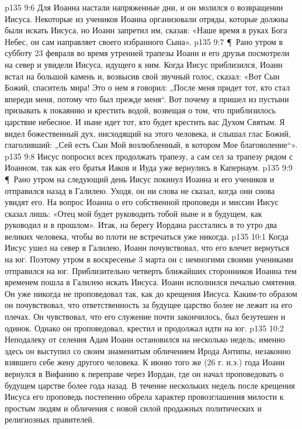 \vs p135 9:6 Для Иоанна настали напряженные дни, и он молился о возвращении Иисуса. Некоторые из учеников Иоанна организовали отряды, которые должны были искать Иисуса, но Иоанн запретил им, сказав: «Наше время в руках Бога Небес, он сам направляет своего избранного Сына».
\vs p135 9:7 \P\ Рано утром в субботу 23 февраля во время утренней трапезы Иоанн и его друзья посмотрели на север и увидели Иисуса, идущего к ним. Когда Иисус приблизился, Иоанн встал на большой камень и, возвысив свой звучный голос, сказал: «Вот Сын Божий, спаситель мира! Это о нем я говорил: „После меня придет тот, кто стал впереди меня, потому что был прежде меня“. Вот почему я пришел из пустыни призывать к покаянию и крестить водой, возвещая о том, что приблизилось царствие небесное. И ныне идет тот, кто будет крестить вас Духом Святым. Я видел божественный дух, нисходящий на этого человека, и слышал глас Божий, глаголивший: „Сей есть Сын Мой возлюбленный, в котором Мое благоволение“».
\vs p135 9:8 Иисус попросил всех продолжать трапезу, а сам сел за трапезу рядом с Иоанном, так как его братья Иаков и Иуда уже вернулись в Капернаум.
\vs p135 9:9 \P\ Рано утром на следующий день Иисус покинул Иоанна и его учеников и отправился назад в Галилею. Уходя, он ни слова не сказал, когда они снова увидят его. На вопрос Иоанна о его собственной проповеди и миссии Иисус сказал лишь: «Отец мой будет руководить тобой ныне и в будущем, как руководил и в прошлом». Итак, на берегу Иордана расстались в то утро два великих человека, чтобы во плоти не встречаться уже никогда.
\vs p135 10:1 Когда Иисус ушел на север в Галилею, Иоанн почувствовал, что его влечет вернуться на юг. Поэтому утром в воскресенье 3 марта он с немногими своими учениками отправился на юг. Приблизительно четверть ближайших сторонников Иоанна тем временем пошла в Галилею искать Иисуса. Иоанн исполнился печалью смятения. Он уже никогда не проповедовал так, как до крещения Иисуса. Каким\hyp{}то образом он почувствовал, что ответственность за будущее царство более не лежит на его плечах. Он чувствовал, что его служение почти закончилось, был безутешен и одинок. Однако он проповедовал, крестил и продолжал идти на юг.
\vs p135 10:2 Неподалеку от селения Адам Иоанн остановился на несколько недель; именно здесь он выступил со своим знаменитым обличением Ирода Антипы, незаконно взявшего себе жену другого человека. К июню того же (26 г. н.э.) года Иоанн вернулся в Вифанию к переправе через Иордан, где он начал проповедовать о будущем царстве более года назад. В течение нескольких недель после крещения Иисуса его проповедь постепенно обрела характер провозглашения милости к простым людям и обличения с новой силой продажных политических и религиозных правителей.
